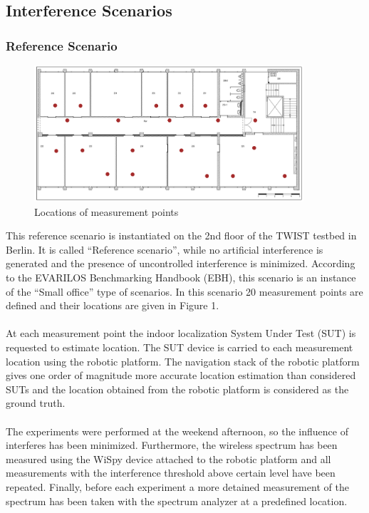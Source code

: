 \documentclass[11pt,a4paper,headinclude,footinclude,chapterprefix=on]{scrreprt}
\begin{document}
\subsection{Interference Scenarios}
\label{sec:interference}

\subsubsection{Reference Scenario} 
\begin{figure}
	[!] \centering 
	\includegraphics[width=100mm]{Images/floor} \caption{Locations of measurement points} \label{fig:floor} 
\end{figure}

This reference scenario is instantiated on the 2nd floor of the TWIST testbed in Berlin. It is called “Reference scenario”, while no artificial interference is generated and the presence of uncontrolled interference is minimized. According to the EVARILOS Benchmarking Handbook (EBH), this scenario is an instance of the “Small office” type of scenarios. In this scenario 20 measurement points are defined and their locations are given in Figure 1.

\paragraph{} At each measurement point the indoor localization System Under Test (SUT) is requested to estimate location. The SUT device is carried to each measurement location using the robotic platform. The navigation stack of the robotic platform gives one order of magnitude more accurate location estimation than considered SUTs and the location obtained from the robotic platform is considered as the ground truth.

\paragraph{} The experiments were performed at the weekend afternoon, so the influence of interferes has been minimized. Furthermore, the wireless spectrum has been measured using the WiSpy device attached to the robotic platform and all measurements with the interference threshold above certain level have been repeated. Finally, before each experiment a more detained measurement of the spectrum has been taken with the spectrum analyzer at a predefined location.
\end{document}
